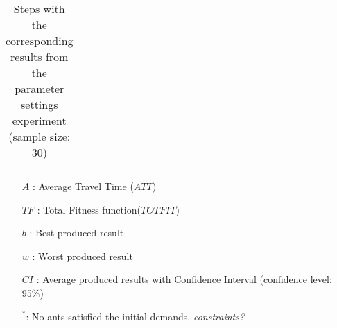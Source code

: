 \begin{sidewaystable}
\begin{tabular}{|l|l|l|l|l|l||c|c|c|c|c|c|c|}
    \hline
    \end{tabular}
    \caption {Steps with the corresponding results from the parameter settings experiment (sample size: 30)}
    \tiny
    \begin{itemize}[noitemsep]
    \item[$A$ :] Average Travel Time ($ATT$)
    \item[$TF$ :] Total Fitness function($TOTFIT$)
    \item[$b$ :] Best produced result
    \item[$w$ :] Worst produced result
    \item[$CI$ :] Average produced results with Confidence Interval (confidence level: 95\%)
    \item[$^*$:] No ants satisfied the initial demands, \emph{\color{blue} constraints?}
    \end{itemize}
    \label{table:pm1}
\end{sidewaystable}



